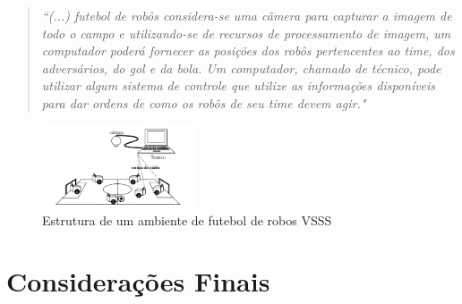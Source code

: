 \begin{quotation}
\textit{
``(...) futebol de robôs considera-se uma câmera para capturar
a imagem de todo o campo e utilizando-se de recursos de processamento de imagem, um
computador poderá fornecer as posições dos robôs pertencentes ao time, dos adversários,
do gol e da bola. Um computador, chamado de técnico, pode utilizar algum sistema de
controle que utilize as informações disponíveis para dar ordens de como os robôs de seu
time devem agir."}\cite{Faria2006}
\end{quotation}
 \begin{figure}[H]
	\centering
	\includegraphics[width=0.4\textwidth]{faria2006.png}
	\caption{Estrutura de um ambiente de futebol de robos VSSS\cite{Faria2006}}
	\label{fig:VSSS}
\end{figure} 
\section{Considerações Finais}